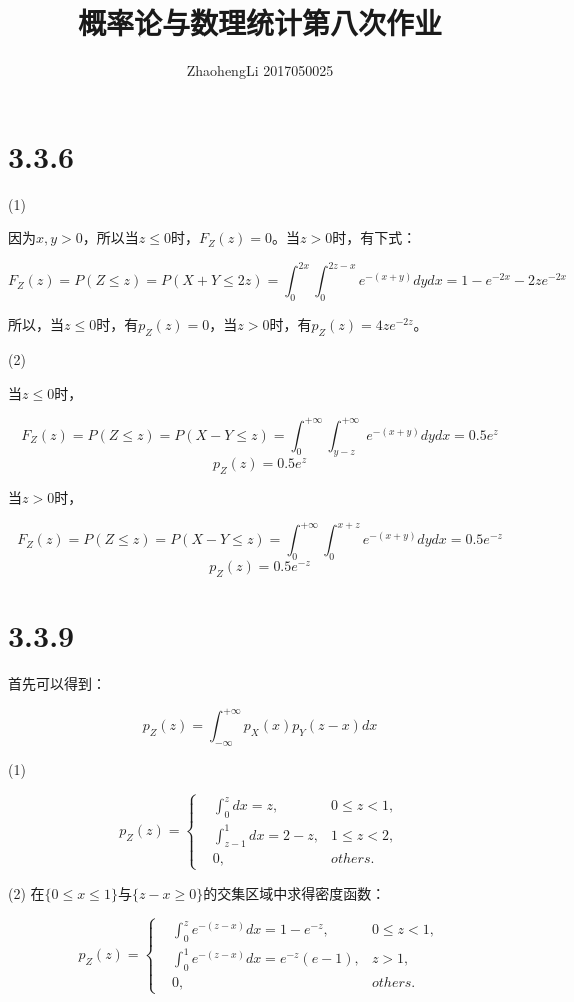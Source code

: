 \documentclass{article}
\title{概率论与数理统计第八次作业}
\author{ZhaohengLi 2017050025}
\begin{document}
\maketitle

\section{3.3.6}
(1)

因为$x,y>0$，所以当$z\leq 0$时，$F_Z(z)=0$。当$z>0$时，有下式：

$$F_Z(z)=P(Z\leq z)=P(X+Y\leq 2z)=\int^{2x}_0\int^{2z-x}_0e^{-(x+y)}dydx=1-e^{-2x}-2ze^{-2x}$$

所以，当$z\leq0$时，有$p_Z(z)=0$，当$z>0$时，有$p_Z(z)=4ze^{-2z}$。

(2)

当$z\leq 0$时，

$$F_Z(z)=P(Z\leq z)=P(X-Y\leq z)=\int^{+\infty}_0\int^{+\infty}_{y-z}e^{-(x+y)}dydx=0.5e^{z}$$
$$p_Z(z)=0.5e^{z}$$

当$z>0$时，

$$F_Z(z)=P(Z\leq z)=P(X-Y\leq z)=\int^{+\infty}_0\int^{x+z}_{0}e^{-(x+y)}dydx=0.5e^{-z}$$
$$p_Z(z)=0.5e^{-z}$$

\section{3.3.9}
首先可以得到：

$$p_Z(z)=\int^{+\infty}_{-\infty}p_X(x)p_Y(z-x)dx$$

(1)

\begin{equation}
p_Z(z)=\left\{
\begin{aligned}
&\int^z_{0}dx=z,&0\leq z<1,\\
&\int^{1}_{z-1}dx=2-z,&1\leq z<2,\\
&0,&others.
\end{aligned}
\right.
\end{equation}

(2)
在$\{0\leq x \leq 1\}$与$\{z-x\geq 0\}$的交集区域中求得密度函数：

\begin{equation}
p_Z(z)=\left\{
\begin{aligned}
&\int^z_{0}e^{-(z-x)}dx=1-e^{-z},&0\leq z<1,\\
&\int^{1}_{0}e^{-(z-x)}dx=e^{-z}(e-1),&z>1,\\
&0,&others.
\end{aligned}
\right.
\end{equation}
\end{document}
